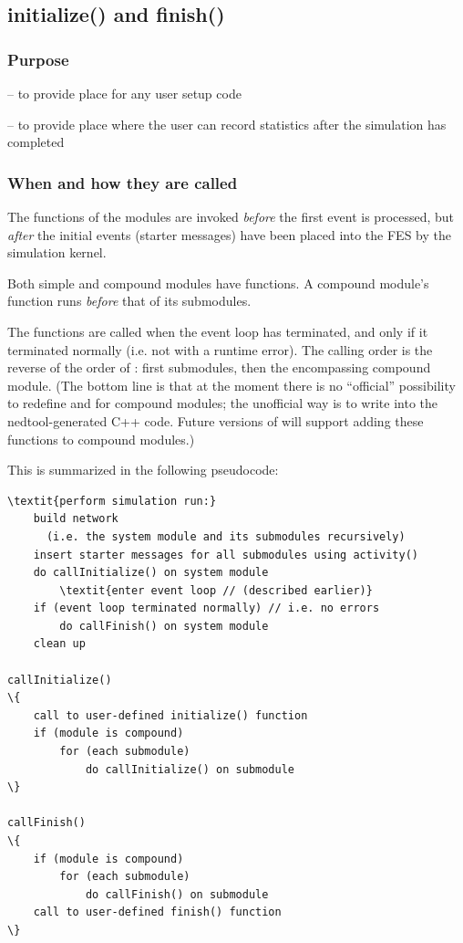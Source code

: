 \subsection{initialize() and finish()}
\label{sec:simple-modules:initialize-and-finish}

\subsubsection{Purpose}


 -- to provide place for any user setup code

 -- to provide place where the user can record statistics
after the simulation has completed


\subsubsection{When and how they are called}


The  functions of the modules are invoked
\textit{before} the first event is processed, but \textit{after} the
initial events (starter messages) have been
placed into the FES by the simulation kernel.


Both simple and compound modules have  functions.
A compound module's  function runs
\textit{before} that of its submodules.


The  functions are called when the event
loop has terminated, and only if it terminated
normally (i.e. not with a runtime error).  The calling order is the
reverse of the order of : first submodules, then the
encompassing compound module. (The bottom line is that at the moment
there is no ``official'' possibility to redefine 
and  for compound modules; the unofficial way is to
write into the nedtool-generated C++ code. Future versions of {\opp} will
support adding these functions to compound modules.)

This is summarized in the following pseudocode:


\begin{Verbatim}[commandchars=\\\{\}]
\textit{perform simulation run:}
    build network
      (i.e. the system module and its submodules recursively)
    insert starter messages for all submodules using activity()
    do callInitialize() on system module
        \textit{enter event loop // (described earlier)}
    if (event loop terminated normally) // i.e. no errors
        do callFinish() on system module
    clean up

callInitialize()
\{
    call to user-defined initialize() function
    if (module is compound)
        for (each submodule)
            do callInitialize() on submodule
\}

callFinish()
\{
    if (module is compound)
        for (each submodule)
            do callFinish() on submodule
    call to user-defined finish() function
\}
\end{Verbatim}



